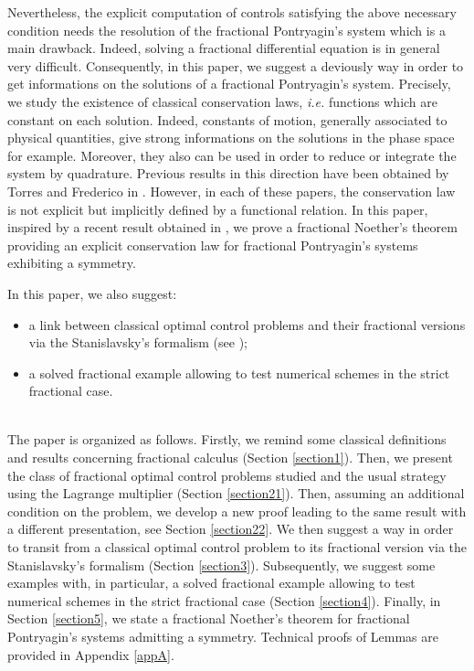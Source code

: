 \documentclass[english,11pt,reqno]{smfart}
\begin{document}
Nevertheless, the explicit computation of controls satisfying the above necessary condition needs the resolution of the fractional Pontryagin's system which is a main drawback. Indeed, solving a fractional differential equation is in general very difficult. Consequently, in this paper, we suggest a deviously way in order to get informations on the solutions of a fractional Pontryagin's system. Precisely, we study the existence of classical conservation laws, \textit{i.e.} functions which are constant on each solution. Indeed, constants of motion, generally associated to physical quantities, give strong informations on the solutions in the phase space for example. Moreover, they also can be used in order to reduce or integrate the system by quadrature. Previous results in this direction have been obtained by Torres and Frederico in \cite{torr,torr2}. However, in each of these papers, the conservation law is not explicit but implicitly defined by a functional relation. In this paper, inspired by a recent result obtained in \cite{bour2}, we prove a fractional Noether's theorem providing an explicit conservation law for fractional Pontryagin's systems exhibiting a symmetry. 

In this paper, we also suggest:
\begin{itemize}
\item a link between classical optimal control problems and their fractional versions via the Stanislavsky's formalism (see \cite{iniz,stan});
\item a solved fractional example allowing to test numerical schemes in the strict fractional case.
\end{itemize}
~\\
The paper is organized as follows. Firstly, we remind some classical definitions and results concerning fractional calculus (Section \ref{section1}). Then, we present the class of fractional optimal control problems studied and the usual strategy using the Lagrange multiplier (Section \ref{section21}). Then, assuming an additional condition on the problem, we develop a new proof leading to the same result with a different presentation, see Section \ref{section22}. We then suggest a way in order to transit from a classical optimal control problem to its fractional version via the Stanislavsky's formalism (Section \ref{section3}). Subsequently, we suggest some examples with, in particular, a solved fractional example allowing to test numerical schemes in the strict fractional case (Section \ref{section4}). Finally, in Section \ref{section5}, we state a fractional Noether's theorem for fractional Pontryagin's systems admitting a symmetry. Technical proofs of Lemmas are provided in Appendix \ref{appA}.
\end{document}
